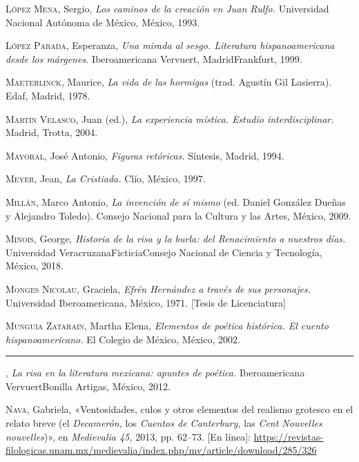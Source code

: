 \documentclass[14pt,twoside,final]{extbook} %
\begin{document}
\textsc{López Mena}, Sergio, \emph{Los caminos de la creación en Juan Rulfo.} Universidad Nacional Autónoma de México, México, 1993.\label{bib:lopezmena1993}

\textsc{López Parada}, Esperanza, \emph{Una mirada al sesgo. Literatura hispanoamericana desde los márgenes.} Iberoamericana Vervuert, Madrid Frankfurt, 1999.\label{bib:lopezparada1999}

\textsc{Maeterlinck}, Maurice, \emph{La vida de las hormigas} (trad. Agustín Gil Lasierra). Edaf, Madrid, 1978.\label{bib:maeterlinck1978}

\textsc{Martín Velasco}, Juan (ed.), \emph{La experiencia mística. Estudio interdisciplinar.} Madrid, Trotta, 2004.\label{bib:martin2004}

\textsc{Mayoral}, José Antonio, \emph{Figuras retóricas.} Síntesis, Madrid, 1994.\label{bib:mayoral1994}

\textsc{Meyer}, Jean, \emph{La Cristiada.} Clío, México, 1997.\label{bib:meyer1997}

\textsc{Millán}, Marco Antonio, \emph{La invención de sí mismo} (ed. Daniel González Dueñas y Alejandro Toledo). Consejo Nacional para la Cultura y las Artes, México, 2009.\label{bib:millan2009}

\textsc{Minois}, George, \emph{Historia de la risa y la burla: del Renacimiento a nuestros días.} Universidad Veracruzana Ficticia Consejo Nacional de Ciencia y Tecnología, México, 2018.\label{bib:minois2018}

\textsc{Monges Nicolau}, Graciela, \emph{Efrén Hernández a través de sus personajes.} Universidad Iberoamericana, México, 1971. [Tesis de Licenciatura]\label{bib:monges1971}

\textsc{Munguía Zatarain}, Martha Elena, \emph{Elementos de poética histórica. El cuento hispanoamericano.} El Colegio de México, México, 2002.\label{bib:munguia2002}

\rule{1cm}{0.4pt}, \emph{La risa en la literatura mexicana: apuntes de poética.} Iberoamericana Vervuert Bonilla Artigas, México, 2012.\label{bib:munguia2012}

\textsc{Nava}, Gabriela, «Ventosidades, culos y otros elementos del realismo grotesco en el relato breve (el \emph{Decamerón,} los \emph{Cuentos de Canterbury,} las \emph{Cent Nouvelles nouvelles})», en \emph{Medievalia 45,} 2013, pp. 62--73. [En línea]: \url{https://revistas-filologicas.unam.mx/medievalia/index.php/mv/article/download/285/326}\label{bib:nava2013}
\end{document}
